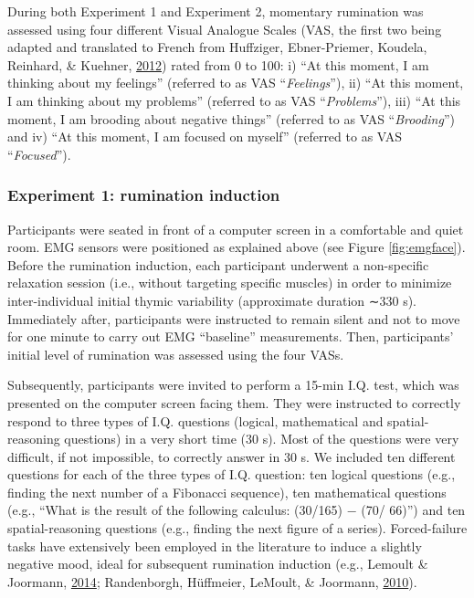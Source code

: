 \documentclass[a4paper,12pt,twoside,openright,oldfontcommands]{memoir}
\begin{document}
During both Experiment 1 and Experiment 2, momentary rumination was assessed using four different Visual Analogue Scales (VAS, the first two being adapted and translated to French from Huffziger, Ebner-Priemer, Koudela, Reinhard, \& Kuehner, \protect\hyperlink{ref-Huffziger2012}{2012}) rated from 0 to 100: i) \enquote{At this moment, I am thinking about my feelings} (referred to as VAS \enquote{\emph{Feelings}}), ii) \enquote{At this moment, I am thinking about my problems} (referred to as VAS \enquote{\emph{Problems}}), iii) \enquote{At this moment, I am brooding about negative things} (referred to as VAS \enquote{\emph{Brooding}}) and iv) \enquote{At this moment, I am focused on myself} (referred to as VAS \enquote{\emph{Focused}}).

\hypertarget{experiment-1-rumination-induction}{%
\subsubsection{Experiment 1: rumination induction}\label{experiment-1-rumination-induction}}

Participants were seated in front of a computer screen in a comfortable and quiet room. EMG sensors were positioned as explained above (see Figure \ref{fig:emgface}). Before the rumination induction, each participant underwent a non-specific relaxation session (i.e., without targeting specific muscles) in order to minimize inter-individual initial thymic variability (approximate duration ∼330 s). Immediately after, participants were instructed to remain silent and not to move for one minute to carry out EMG \enquote{baseline} measurements. Then, participants' initial level of rumination was assessed using the four VASs.

Subsequently, participants were invited to perform a 15-min I.Q. test, which was presented on the computer screen facing them. They were instructed to correctly respond to three types of I.Q. questions (logical, mathematical and spatial-reasoning questions) in a very short time (30 s). Most of the questions were very difficult, if not impossible, to correctly answer in 30 s. We included ten different questions for each of the three types of I.Q. question: ten logical questions (e.g., finding the next number of a Fibonacci sequence), ten mathematical questions (e.g., \enquote{What is the result of the following calculus: (30/165) − (70/ 66)}) and ten spatial-reasoning questions (e.g., finding the next figure of a series). Forced-failure tasks have extensively been employed in the literature to induce a slightly negative mood, ideal for subsequent rumination induction (e.g., Lemoult \& Joormann, \protect\hyperlink{ref-Lemoult2014}{2014}; Randenborgh, Hüffmeier, LeMoult, \& Joormann, \protect\hyperlink{ref-VanRandenborgh2010}{2010}).
\end{document}
